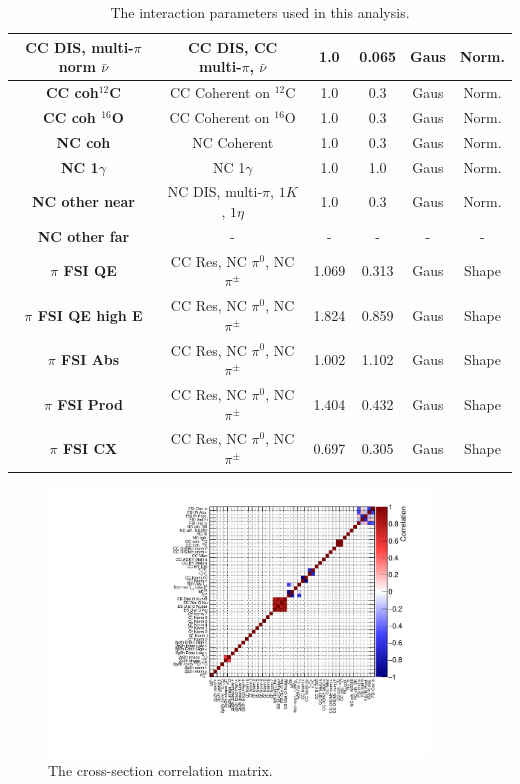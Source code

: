 \begin{center}
\begin{table}
\begin{adjustwidth}{-.9in}{-.9in}
{\begin{tabular}{ c||c|c|c|c|c}
\hline
\textbf{CC DIS, multi-$\pi$ norm $\bar{\nu}$} & CC DIS, CC multi-$\pi$, $\bar{\nu}$ & 1.0 & 0.065 & Gaus & Norm.\\
\hline
\textbf{CC coh$^{12}$C} & CC Coherent on $^{12}$C & 1.0 & 0.3 & Gaus & Norm.\\
\hline
\textbf{CC coh $^{16}$O} & CC Coherent on $^{16}$O & 1.0 & 0.3 &  Gaus & Norm.\\
\hline
\textbf{NC coh} & NC Coherent & 1.0 & 0.3 & Gaus & Norm.\\
\hline
\textbf{NC 1$\gamma$} & NC 1$\gamma$ & 1.0 & 1.0 & Gaus & Norm.\\
\hline
\textbf{NC other near} & NC DIS, multi-$\pi$, $1K$, $1\eta$ & 1.0 & 0.3 & Gaus & Norm.\\
\hline
\textbf{NC other far} & - & - & - & - & -\\
\hline
\textbf{$\pi$ FSI QE} & CC Res, NC $\pi^{0}$, NC $\pi^{\pm}$ & 1.069 & 0.313 & Gaus & Shape\\
\hline
\textbf{$\pi$ FSI QE high E} & CC Res, NC $\pi^{0}$, NC $\pi^{\pm}$ & 1.824 & 0.859 & Gaus & Shape\\
\hline
\textbf{$\pi$ FSI Abs} &  CC Res, NC $\pi^{0}$, NC $\pi^{\pm}$ & 1.002 & 1.102 & Gaus & Shape\\
\hline
\textbf{$\pi$ FSI Prod} & CC Res, NC $\pi^{0}$, NC $\pi^{\pm}$ & 1.404 & 0.432 & Gaus & Shape\\
\hline
\textbf{$\pi$ FSI CX} &  CC Res, NC $\pi^{0}$, NC $\pi^{\pm}$ & 0.697 & 0.305 & Gaus & Shape\\
\hline
\hline
\end{tabular}}
\caption{The interaction parameters used in this analysis.}\label{tab:xsecparams}
\end{adjustwidth}
\end{table}
\end{center}

\begin{figure}
\centering
\includegraphics*[width=0.9\textwidth,clip]{figs/xseccorr}
\caption{The cross-section correlation matrix.}\label{fig:xseccov}
\end{figure}

